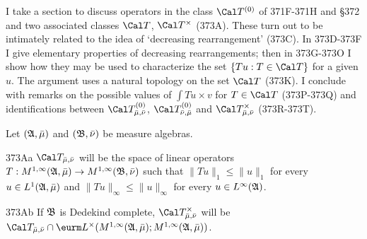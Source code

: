      
\def\chaptername{Linear operators between function spaces}
\def\sectionname{Decreasing rearrangements}
     
     
I take a section to discuss operators in the class $\Cal T^{(0)}$ of
371F-371H and \S372 and two associated classes $\Cal T$, 
$\Cal T^{\times}$ (373A).   These turn
out to be intimately related to the idea of `decreasing
rearrangement' (373C).   In 373D-373F I give elementary properties of
decreasing rearrangements;  then in 373G-373O I show how they may be
used to characterize the set $\{Tu:T\in\Cal T\}$ for a given $u$.
The argument uses a natural topology on the set $\Cal T$ (373K).
I conclude with remarks on the possible values of $\int Tu\times v$ for
$T\in\Cal T$ (373P-373Q) and identifications between $\Cal
T^{(0)}_{\bar\mu,\bar\nu}$, $\Cal T^{(0)}_{\bar\nu,\bar\mu}$ and $\Cal
T^{\times}_{\bar\mu,\bar\nu}$ (373R-373T).
     
 Let $(\frak A,\bar\mu)$ and 
$(\frak B,\bar\nu)$ be measure algebras.   %
     
\spheader 373Aa $\Cal T_{\bar\mu,\bar\nu}$ will be
the space of linear operators 
$T:M^{1,\infty}(\frak A,\bar\mu)\to M^{1,\infty}(\frak B,\bar\nu)$ such that $\|Tu\|_1\le\|u\|_1$ for every
$u\in L^1(\frak A,\bar\mu)$ and $\|Tu\|_{\infty}\le\|u\|_{\infty}$ for
every $u\in L^{\infty}(\frak A)$.   
     
\spheader 373Ab If $\frak B$ is Dedekind complete, 
$\Cal T^{\times}_{\bar\mu,\bar\nu}$ will be 
$\Cal T_{\bar\mu,\bar\nu}
\cap\eurm L^{\times}(M^{1,\infty}(\frak A,\bar\mu);
\discretionary{}{}{}M^{1,\infty}(\frak A,\bar\mu))$.
     
